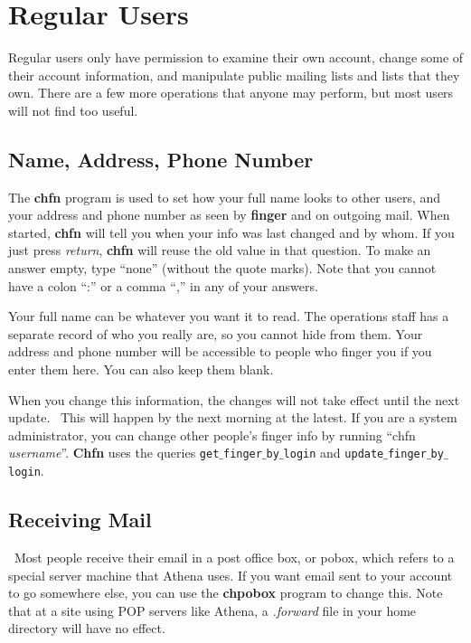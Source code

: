 \documentclass{book}
\begin{document}
\chapter{Regular Users}

Regular users only have permission to examine their own account,
change some of their account information, and manipulate public
mailing lists and lists that they own.  There are a few more
operations that anyone may perform, but most users will not find too
useful.

\section{Name, Address, Phone Number}

The {\bf chfn} program is used to set how your full name looks to
other users, and your address and phone number as seen by {\bf finger}
and on outgoing mail.  When started, {\bf chfn} will tell you when
your info was last changed and by whom.  If you just press {\em
return}, {\bf chfn} will reuse the old value in that question.  To
make an answer empty, type ``none'' (without the quote marks).  Note
that you cannot have a colon ``:'' or a comma ``,'' in any of your
answers.

Your full name can be whatever you want it to read.  The operations
staff has a separate record of who you really are, so you cannot hide
from them.  Your address and phone number will be accessible to people
who finger you if you enter them here.  You can also keep them blank.

When you change this information, the changes will not take effect
until the next update.  \athena\ This will happen by the next morning
at the latest.  If you are a system administrator, you can change
other people's finger info by running ``chfn {\em username}''.  {\bf Chfn}
uses the queries {\tt get$\_$finger$\_$by$\_$login} and {\tt update$\_$finger$\_$by$\_$login}.

\section{Receiving Mail}

\label{pobox}

\athena\ Most people receive their email in a post office box, or
pobox, which refers to a special server machine that Athena uses.  If
you want email sent to your account to go somewhere else, you can use
the {\bf chpobox} program to change this.  Note that at a site using POP
servers like Athena, a {\em .forward} file in your home directory will
have no effect.
\end{document}

